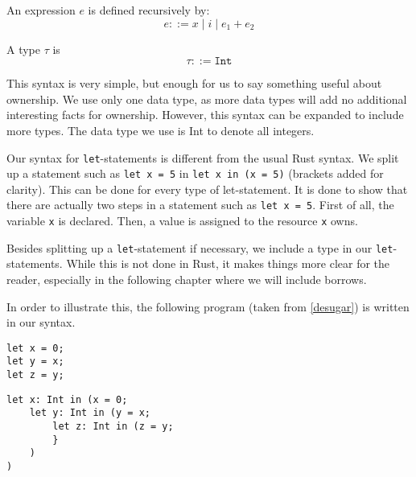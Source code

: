 \begin{definition}
\label{expressionsmove}
An expression $e$ is defined recursively by:
$$e ::= x \mid i \mid e_1 + e_2$$
\end{definition}

\begin{definition}
\label{typesmove}
A type $\tau$ is
$$\tau ::= \texttt{Int}$$
\end{definition}

This syntax is very simple, but enough for us to say something useful about ownership. We use only one data type, as more data types will add no additional interesting facts for ownership. However, this syntax can be expanded to include more types. The data type we use is Int to denote all integers.

Our syntax for \texttt{let}-statements is different from the usual Rust syntax. We split up a statement such as \verb|let x = 5| in \texttt{let x in (x = 5)} (brackets added for clarity). This can be done for every type of let-statement. It is done to show that there are actually two steps in a statement such as \texttt{let x = 5}. First of all, the variable \verb|x| is declared. Then, a value is assigned to the resource \verb|x| owns. 

Besides splitting up a \texttt{let}-statement if necessary, we include a type in our \texttt{let}-statements. While this is not done in Rust, it makes things more clear for the reader, especially in the following chapter where we will include borrows. 

In order to illustrate this, the following program (taken from \ref{desugar}) is written in our syntax. 

\begin{verbatim}
let x = 0;
let y = x;
let z = y;
\end{verbatim}

\begin{verbatim}
let x: Int in (x = 0;
    let y: Int in (y = x;
        let z: Int in (z = y;
        }
    )
)
\end{verbatim}


